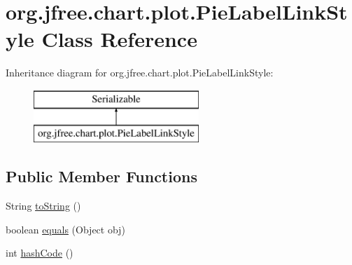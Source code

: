 \hypertarget{classorg_1_1jfree_1_1chart_1_1plot_1_1_pie_label_link_style}{}\section{org.\+jfree.\+chart.\+plot.\+Pie\+Label\+Link\+Style Class Reference}
\label{classorg_1_1jfree_1_1chart_1_1plot_1_1_pie_label_link_style}
Inheritance diagram for org.\+jfree.\+chart.\+plot.\+Pie\+Label\+Link\+Style\+:\begin{figure}[H]
\begin{center}
\leavevmode
\includegraphics[height=2.000000cm]{classorg_1_1jfree_1_1chart_1_1plot_1_1_pie_label_link_style}
\end{center}
\end{figure}
\subsection*{Public Member Functions}
\begin{DoxyCompactItemize}
\item 
String \mbox{\hyperlink{classorg_1_1jfree_1_1chart_1_1plot_1_1_pie_label_link_style_a943bf1863e66cbd4bcfacfdee30dc3e9}{to\+String}} ()
\item 
boolean \mbox{\hyperlink{classorg_1_1jfree_1_1chart_1_1plot_1_1_pie_label_link_style_aa3ea1fec9d372d0e642b8ef86125dbf4}{equals}} (Object obj)
\item 
int \mbox{\hyperlink{classorg_1_1jfree_1_1chart_1_1plot_1_1_pie_label_link_style_a8f338f8b0b7bd9be04044970bd8d912f}{hash\+Code}} ()
\end{DoxyCompactItemize}
